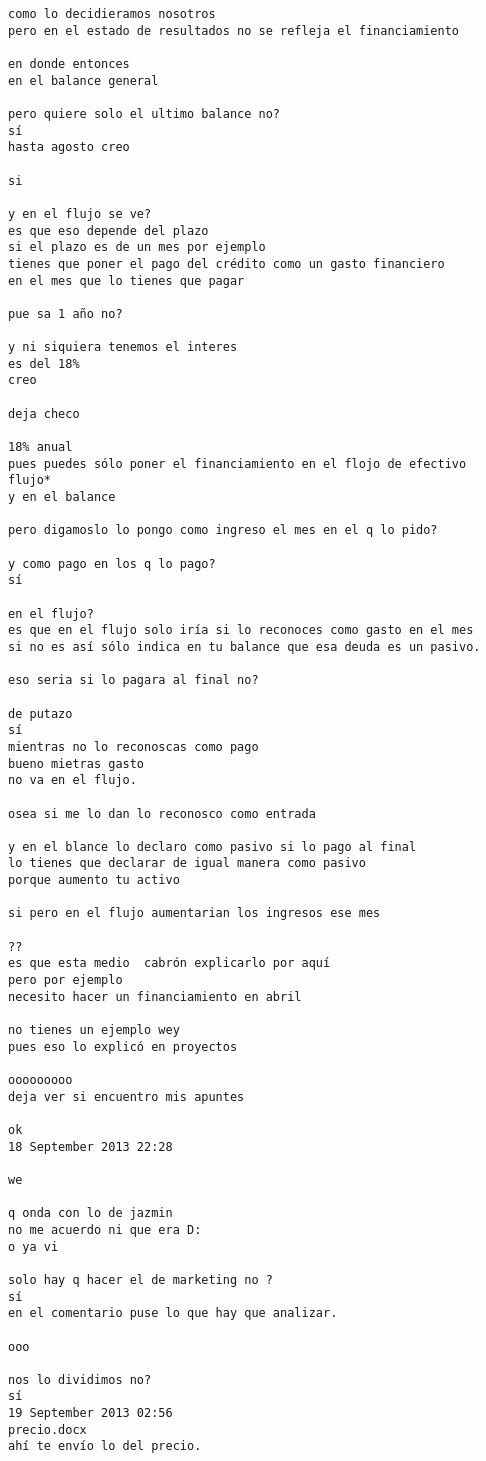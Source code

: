 \begin{verbatim}
como lo decidieramos nosotros
pero en el estado de resultados no se refleja el financiamiento

en donde entonces
en el balance general

pero quiere solo el ultimo balance no?
sí
hasta agosto creo

si

y en el flujo se ve?
es que eso depende del plazo
si el plazo es de un mes por ejemplo
tienes que poner el pago del crédito como un gasto financiero
en el mes que lo tienes que pagar

pue sa 1 año no?

y ni siquiera tenemos el interes
es del 18%
creo

deja checo

18% anual
pues puedes sólo poner el financiamiento en el flojo de efectivo
flujo*
y en el balance

pero digamoslo lo pongo como ingreso el mes en el q lo pido?

y como pago en los q lo pago?
sí

en el flujo?
es que en el flujo solo iría si lo reconoces como gasto en el mes
si no es así sólo indica en tu balance que esa deuda es un pasivo.

eso seria si lo pagara al final no?

de putazo
sí
mientras no lo reconoscas como pago
bueno mietras gasto
no va en el flujo.

osea si me lo dan lo reconosco como entrada

y en el blance lo declaro como pasivo si lo pago al final
lo tienes que declarar de igual manera como pasivo
porque aumento tu activo

si pero en el flujo aumentarian los ingresos ese mes

??
es que esta medio  cabrón explicarlo por aquí
pero por ejemplo
necesito hacer un financiamiento en abril

no tienes un ejemplo wey
pues eso lo explicó en proyectos

ooooooooo
deja ver si encuentro mis apuntes

ok
18 September 2013 22:28

we

q onda con lo de jazmin
no me acuerdo ni que era D:
o ya vi

solo hay q hacer el de marketing no ?
sí
en el comentario puse lo que hay que analizar.

ooo

nos lo dividimos no?
sí
19 September 2013 02:56
precio.docx
ahí te envío lo del precio.


\end{verbatim}
